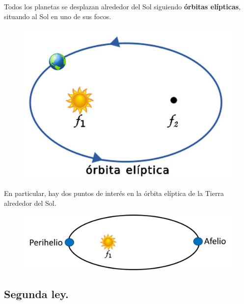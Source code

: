\documentclass[14pt]{extarticle}
\newcommand{\textocolor}[2]{\textbf{\textcolor{#1}{#2}}}
\begin{document}
Todos los planetas se desplazan alrededor del Sol siguiendo \textocolor{byzantine}{órbitas elípticas}, situando al Sol en uno de sus focos.
\begin{figure}[H]
    \centering
    \includegraphics[scale=0.4]{Imagenes/Kepler_Leyes_01.png}
\end{figure}

En particular, hay dos puntos de interés en la órbita elíptica de la Tierra alrededor del Sol.
\begin{figure}[H]
    \centering
    \includegraphics[scale=0.75]{Imagenes/Kepler_Leyes_01_b.png}
\end{figure}

\subsection{Segunda ley.}
\end{document}
